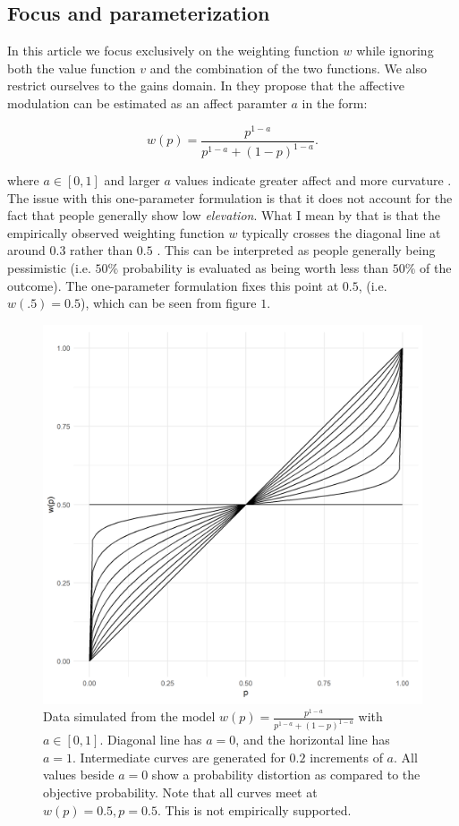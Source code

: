 \documentclass[12pt]{article}
\begin{document}
\subsection{Focus and parameterization}

In this article we focus exclusively on the
weighting function $w$ while ignoring both
the value function $v$ and the combination
of the two functions. We also restrict ourselves
to the gains domain.
In \textcite{rottenstreich2001money} they
propose that the affective modulation can
be estimated as an affect paramter $a$
in the form:

\[
	w(p) = \frac{p^{1-a}}
	{p^{1-a}+(1-p)^{1-a}}
.\]

where $a \in [0, 1]$ and larger $a$ values indicate
greater affect
and more curvature \autocite{rottenstreich2001money}.
The issue with this one-parameter
formulation is that it
does not account for the fact that people
generally show low \emph{elevation}.
What I mean by that is that the empirically
observed weighting function $w$ typically
crosses the diagonal line
at around $0.3$ rather than $0.5$
\autocite{gonzalez1999shape}. This can be
interpreted as people generally being
pessimistic (i.e. $50\%$ probability is
evaluated as being worth less than  $50\%$
of the outcome).
The one-parameter
formulation fixes this point at $0.5$,
(i.e. $w(.5) = 0.5$),
which can be seen from figure $1$.

\begin{figure}[H]
	\includegraphics[width = \linewidth]{../Figures/oneParam.png}
	\caption{Data simulated from the model
		$w(p) = \frac{p^{1-a}}
		{p^{1-a}+(1-p)^{1-a}}$ with
		$a \in [0, 1]$. Diagonal line has
		$a = 0$, and the horizontal line
		has $a = 1$. Intermediate curves
		are generated for $0.2$ increments
		of $a$. All values beside
		$a = 0$ show a probability distortion
		as compared to the objective probability.
		Note that all curves meet at
		$w(p) = 0.5, p = 0.5$. This is
	not empirically supported.}
\end{figure}
\end{document}
